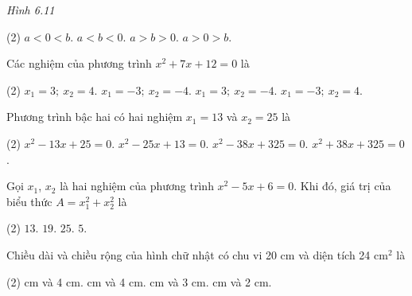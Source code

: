 \begin{exercises}
\begin{questions}[resume=SGK]
\begin{center}

            \textit{Hình 6.11}
        \end{center}

        \begin{tasks}(2)
            \task[(A)] $a<0<b$.
            \task[(B)] $a<b<0$.
            \task[(C)] $a>b>0$.
            \task[(D)] $a>0>b$.
        \end{tasks}
        \par\noindent\answerbox\par

        \item Các nghiệm của phương trình $x^2+7x+12=0$ là
        \begin{tasks}(2)
            \task[(A)] $x_1=3;\ x_2=4$.
            \task[(B)] $x_1=-3;\ x_2=-4$.
            \task[(C)] $x_1=3;\ x_2=-4$.
            \task[(D)] $x_1=-3;\ x_2=4$.
        \end{tasks}
        \par\noindent\answerbox\par

        \item Phương trình bậc hai có hai nghiệm $x_1=13$ và $x_2=25$ là
        \begin{tasks}(2)
            \task[(A)] $x^2-13x+25=0$.
            \task[(B)] $x^2-25x+13=0$.
            \task[(C)] $x^2-38x+325=0$.
            \task[(D)] $x^2+38x+325=0$.
        \end{tasks}
        \par\noindent\answerbox\par

        \item Gọi $x_1$, $x_2$ là hai nghiệm của phương trình $x^2-5x+6=0$. Khi đó, giá trị của biểu thức $A=x_1^2+x_2^2$ là
        \begin{tasks}(2)
            \task[(A)] $13$.
            \task[(B)] $19$.
            \task[(C)] $25$.
            \task[(D)] $5$.
        \end{tasks}
        \par\noindent\answerbox\par

        \item Chiều dài và chiều rộng của hình chữ nhật có chu vi 20 cm và diện tích 24 cm$^2$ là
        \begin{tasks}(2)
             cm và 4 cm.
             cm và 4 cm.
             cm và 3 cm.
             cm và 2 cm.
        \end{tasks}
        \par\noindent\answerbox\par
    \end{questions}


\end{exercises}
